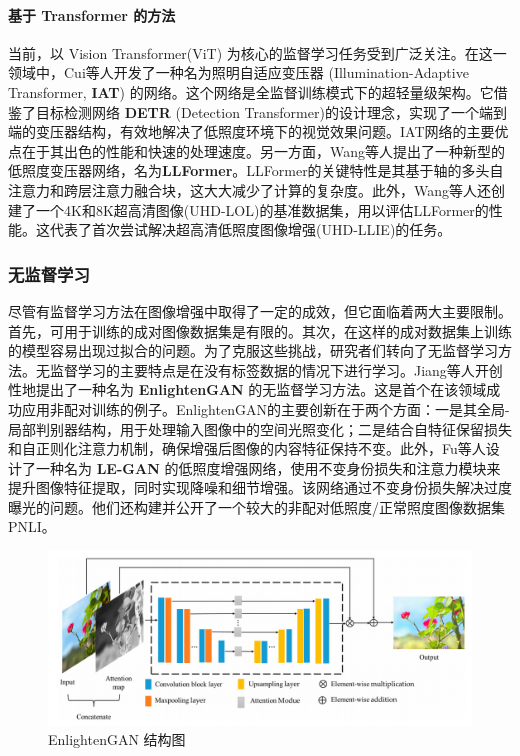 \documentclass[a4paper, 10pt]{article}
\begin{document}
	\paragraph{基于 Transformer 的方法}
	
	当前，以 Vision Transformer(ViT) 为核心的监督学习任务受到广泛关注。在这一领域中，Cui等人\cite{cui2022illumination}开发了一种名为照明自适应变压器 (Illumination-Adaptive Transformer, \textbf{IAT}) 的网络。这个网络是全监督训练模式下的超轻量级架构。它借鉴了目标检测网络 \textbf{DETR} (Detection Transformer)的设计理念\cite{carion2020end}，实现了一个端到端的变压器结构，有效地解决了低照度环境下的视觉效果问题。IAT网络的主要优点在于其出色的性能和快速的处理速度。另一方面，Wang等人\cite{wang2023ultra}提出了一种新型的低照度变压器网络，名为\textbf{LLFormer}。LLFormer的关键特性是其基于轴的多头自注意力和跨层注意力融合块，这大大减少了计算的复杂度。此外，Wang等人还创建了一个4K和8K超高清图像(UHD-LOL)的基准数据集，用以评估LLFormer的性能。这代表了首次尝试解决超高清低照度图像增强(UHD-LLIE)的任务。
	
	\subsubsection{无监督学习}
	
	尽管有监督学习方法在图像增强中取得了一定的成效，但它面临着两大主要限制。首先，可用于训练的成对图像数据集是有限的。其次，在这样的成对数据集上训练的模型容易出现过拟合的问题。为了克服这些挑战，研究者们转向了无监督学习方法。无监督学习的主要特点是在没有标签数据的情况下进行学习。Jiang等人\cite{jiang2021enlightengan}开创性地提出了一种名为 \textbf{EnlightenGAN} 的无监督学习方法。这是首个在该领域成功应用非配对训练的例子。EnlightenGAN的主要创新在于两个方面：一是其全局-局部判别器结构，用于处理输入图像中的空间光照变化；二是结合自特征保留损失和自正则化注意力机制，确保增强后图像的内容特征保持不变。此外，Fu等人\cite{fu2022gan}设计了一种名为 \textbf{LE-GAN} 的低照度增强网络，使用不变身份损失和注意力模块来提升图像特征提取，同时实现降噪和细节增强。该网络通过不变身份损失解决过度曝光的问题。他们还构建并公开了一个较大的非配对低照度/正常照度图像数据集PNLI。
	
	\begin{figure}[htb]
		\centering 
		\includegraphics[width=\columnwidth]{picture/LLIE/EnlightenGAN/EnlightenGAN}
		\caption{
			\label{fig: EnlightenGAN} 
			EnlightenGAN 结构图
		}
	\end{figure}
	
\end{document}
